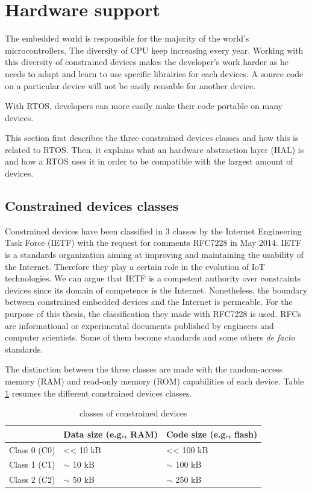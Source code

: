 \section{Hardware support}

The embedded world is responsible for the majority of the world's microcontrollers.
The diversity of CPU keep increasing every year.
Working with this diversity of constrained devices makes the developer's work harder as he needs to adapt and learn to use specific librairies for each devices.
A source code on a particular device will not be easily reusable for another device.

With RTOS, developers can more easily make their code portable on many devices.

This section first describes the three constrained devices classes and how this is related to RTOS.
Then, it explains what an hardware abstraction layer (HAL) is and how a RTOS uses it in order to be compatible with the largest amount of devices.

\subsection{Constrained devices classes}

Constrained devices have been classified in 3 classes by the Internet Engineering Task Force (IETF) with the request for comments RFC7228 in May 2014.
IETF is a standards organization aiming at improving and maintaining the usability of the Internet.
Therefore they play a certain role in the evolution of IoT technologies.
We can argue that IETF is a competent authority over constraints devices since its domain of competence is the Internet.
Nonetheless, the boundary between constrained embedded devices and the Internet is permeable.
For the purpose of this thesis, the classification they made with RFC7228 is used.
RFCs are informational or experimental documents published by engineers and computer scientists.
Some of them become standards and some others \textit{de facto} standards.

The distinction between the three classes are made with the random-access memory (RAM) and read-only memory (ROM) capabilities of each device.
Table \ref{tab:constrained-devices-classes} resumes the different constrained devices classes.

\begin{table}[!h]
  \centering
  \begin{tabular}{|l|l|l|}
  \hline
   & Data size (e.g., RAM) & Code size (e.g., flash) \\ \hline
  Class 0 (C0) & \textless{}\textless{} 10 kB & \textless{}\textless{} 100 kB \\ %
  Class 1 (C1) & $\sim$ 10 kB & $\sim$ 100 kB \\ %
  Class 2 (C2) & $\sim$ 50 kB & $\sim$ 250 kB \\ \hline
  \end{tabular}
  \caption{classes of constrained devices}
  \label{tab:constrained-devices-classes}
\end{table}

